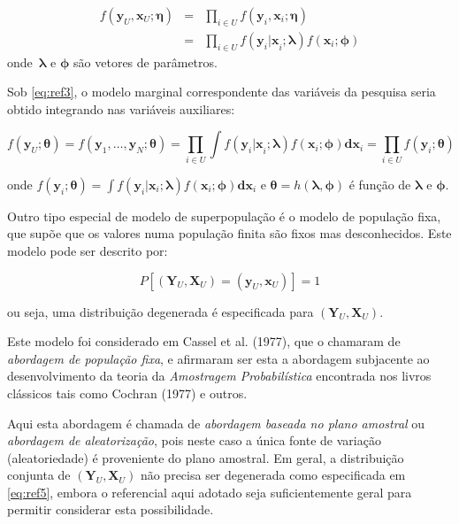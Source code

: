 \documentclass[
  12pt,
  brazilian,
]{book}
\theoremstyle{definition}
\theoremstyle{definition}
\theoremstyle{definition}
\theoremstyle{definition}
\theoremstyle{remark}
\begin{document}
\begin{eqnarray}
f \left( \mathbf{y}_U , \mathbf{x}_U ; \mathbf{\eta} \right) 
&=&\prod_{i\in U} f\left(\mathbf{y}_i , \mathbf{x}_i ; \mathbf{\eta} \right)\nonumber\\
&=&\prod_{i\in U} f\left( \mathbf{y}_i \mathbf{|x}_i ; \mathbf{\lambda} \right) 
f\left( \mathbf{x}_i ; \mathbf{\phi} \right) \label{eq:ref3}
\end{eqnarray}
onde~\(\mathbf{\lambda}\) e \(\mathbf{\phi}\) são vetores de parâmetros.

Sob \eqref{eq:ref3}, o modelo marginal correspondente das variáveis da pesquisa
seria obtido integrando nas variáveis auxiliares:

\begin{equation}
f(\mathbf{y}_U ; \mathbf{\theta}) = f(\mathbf{y}_1 ,\ldots ,\mathbf{y}_N ; \mathbf{\theta}) = \prod_{i\in U} \int f\left( \mathbf{y}_i \mathbf{|x}_i ; \mathbf{\lambda} \right) f\left( \mathbf{x}_i ; \mathbf{\phi} \right) \mathbf{dx}_i = \prod_{i\in U} f\left( \mathbf{y}_i ; \mathbf{\theta} \right) \label{eq:ref4}
\end{equation}

onde \(f\left( \mathbf{y}_i ; \mathbf{\theta} \right) = \int f\left( \mathbf{y}_i | \mathbf{x}_i ; \mathbf{\lambda} \right) f\left( \mathbf{x}_i ; \mathbf{\phi} \right) \mathbf{dx}_i\) e \(\mathbf{\theta =} h\left( \mathbf{\lambda} , \mathbf{\phi} \right)\) é função de \(\mathbf{\lambda}\) e \(\mathbf{\phi}\).

Outro tipo especial de modelo de superpopulação é o modelo de população fixa,
que supõe que os valores numa população finita são fixos mas desconhecidos. Este
modelo pode ser descrito por:

\begin{equation}
P\left[ \left( \mathbf{Y}_U , \mathbf{X}_U \right) = \left( \mathbf{y}_U , \mathbf{x}_U \right) \right] = 1 \label{eq:ref5}
\end{equation}

ou seja, uma distribuição degenerada é especificada para
\(\left(\mathbf{Y}_U , \mathbf{X}_U \right)\).

Este modelo foi considerado em Cassel et al. (1977), que o chamaram de \emph{abordagem de população fixa}, e afirmaram ser esta a abordagem subjacente ao desenvolvimento
da teoria da \emph{Amostragem Probabilística} encontrada nos livros clássicos tais como Cochran (1977) e outros.

Aqui esta abordagem é chamada de \emph{abordagem baseada no plano amostral} ou \emph{abordagem de aleatorização}, pois neste caso a única fonte de variação (aleatoriedade) é proveniente do plano amostral. Em geral, a distribuição conjunta de \(\left( \mathbf{Y}_U , \mathbf{X}_U \right)\) não precisa ser degenerada como especificada em \eqref{eq:ref5}, embora o referencial aqui adotado seja suficientemente geral para permitir considerar esta possibilidade.
\end{document}
